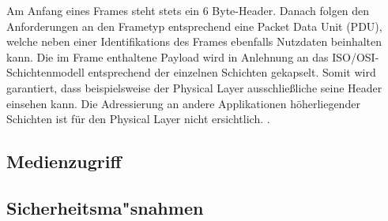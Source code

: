 Am Anfang eines Frames steht stets ein 6 Byte-Header. Danach folgen den Anforderungen an den Frametyp entsprechend eine Packet Data Unit (PDU), welche neben einer Identifikations des Frames ebenfalls Nutzdaten beinhalten kann. Die im Frame enthaltene Payload wird in Anlehnung an das ISO/OSI-Schichtenmodell entsprechend der einzelnen Schichten gekapselt. Somit wird garantiert, dass beispielsweise der Physical Layer ausschließliche seine Header einsehen kann. Die Adressierung an andere Applikationen höherliegender Schichten ist für den Physical Layer nicht ersichtlich.
\cite{d:hesse} \cite{d:ieee}.

\subsection{Medienzugriff}\label{ss:Medienzugriff}

\subsection{Sicherheitsma"snahmen}\label{ss:Sicherheitsmassnahmen}